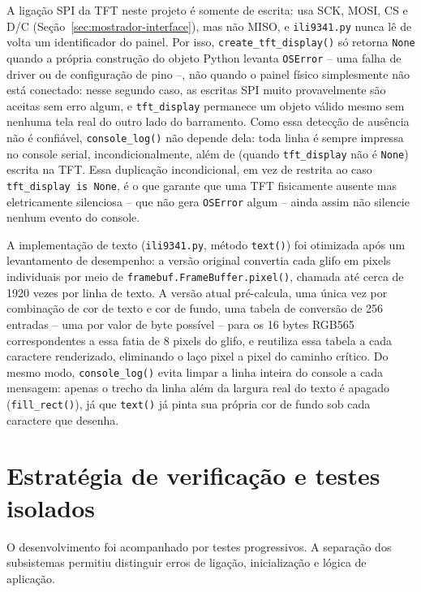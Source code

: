 \documentclass[12pt,a4paper]{article}
\begin{document}
A ligação SPI da TFT neste projeto é somente de escrita: usa SCK, MOSI, CS e D/C (Seção~\ref{sec:mostrador-interface}), mas não MISO, e \texttt{ili9341.py} nunca lê de volta um identificador do painel. Por isso, \texttt{create\_tft\_display()} só retorna \texttt{None} quando a própria construção do objeto Python levanta \texttt{OSError} -- uma falha de driver ou de configuração de pino --, não quando o painel físico simplesmente não está conectado: nesse segundo caso, as escritas SPI muito provavelmente são aceitas sem erro algum, e \texttt{tft\_display} permanece um objeto válido mesmo sem nenhuma tela real do outro lado do barramento. Como essa detecção de ausência não é confiável, \texttt{console\_log()} não depende dela: toda linha é sempre impressa no console serial, incondicionalmente, além de (quando \texttt{tft\_display} não é \texttt{None}) escrita na TFT. Essa duplicação incondicional, em vez de restrita ao caso \texttt{tft\_display is None}, é o que garante que uma TFT fisicamente ausente mas eletricamente silenciosa -- que não gera \texttt{OSError} algum -- ainda assim não silencie nenhum evento do console.

A implementação de texto (\texttt{ili9341.py}, método \texttt{text()}) foi otimizada após um levantamento de desempenho: a versão original convertia cada glifo em pixels individuais por meio de \texttt{framebuf.FrameBuffer.pixel()}, chamada até cerca de 1920 vezes por linha de texto. A versão atual pré-calcula, uma única vez por combinação de cor de texto e cor de fundo, uma tabela de conversão de 256 entradas -- uma por valor de byte possível -- para os 16 bytes RGB565 correspondentes a essa fatia de 8 pixels do glifo, e reutiliza essa tabela a cada caractere renderizado, eliminando o laço pixel a pixel do caminho crítico. Do mesmo modo, \texttt{console\_log()} evita limpar a linha inteira do console a cada mensagem: apenas o trecho da linha além da largura real do texto é apagado (\texttt{fill\_rect()}), já que \texttt{text()} já pinta sua própria cor de fundo sob cada caractere que desenha.

\section{Estratégia de verificação e testes isolados}
\label{sec:testes}

O desenvolvimento foi acompanhado por testes progressivos. A separação dos subsistemas permitiu distinguir erros de ligação, inicialização e lógica de aplicação.
\end{document}
